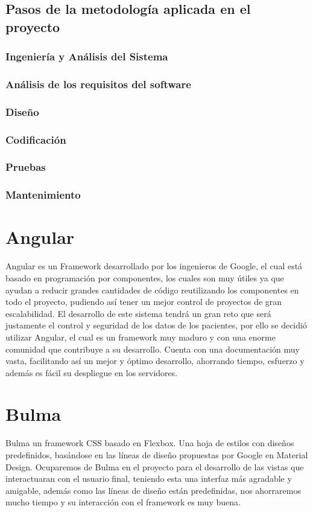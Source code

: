     \subsection{Pasos de la metodología aplicada en el proyecto}
          \subsubsection{Ingeniería y Análisis del Sistema}
          \subsubsection{Análisis de los requisitos del software}
          \subsubsection{Diseño}
          \subsubsection{Codificación}
          \subsubsection{Pruebas}
          \subsubsection{Mantenimiento}


\section{Angular }
Angular es un Framework desarrollado por los ingenieros de Google, el cual está basado en programación por componentes, los cuales son muy útiles ya que ayudan a reducir grandes cantidades de código reutilizando los componentes en todo el proyecto, pudiendo así tener un mejor control de proyectos de gran escalabilidad. El desarrollo de este sistema tendrá un gran reto que será justamente el control y seguridad de los datos de los pacientes, por ello se decidió utilizar Angular, el cual es un framework muy maduro y con una enorme comunidad que contribuye a su desarrollo. Cuenta con una documentación muy vasta, facilitando así un mejor y óptimo desarrollo, ahorrando tiempo, esfuerzo y además es fácil su despliegue en los servidores. \cite{Angular}

\section{Bulma}
Bulma un framework CSS basado en Flexbox. Una hoja de estilos con diseños predefinidos, basándose en las líneas de diseño propuestas por Google en Material Design.
Ocuparemos de Bulma en el proyecto para el desarrollo de las vistas que interactuaran con el usuario final, teniendo esta una interfaz más agradable y amigable, además como las líneas de diseño están predefinidas, nos ahorraremos mucho tiempo y su interacción con el framework es muy buena. \cite{Bulma}

